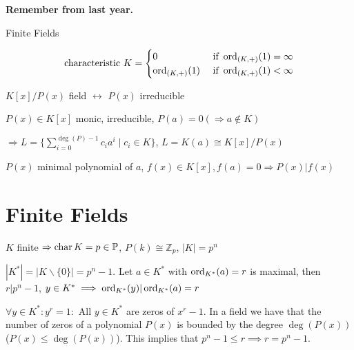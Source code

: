 

\textbf{Remember from last year.}

Finite Fields

\[
  \text{characteristic } K =
  \begin{cases}
    0                & \text{ if } \operatorname{ord}_{(K,+)} (1) = \infty \\
    \operatorname{ord}_{(K,+)} (1) & \text{ if } \operatorname{ord}_{(K,+)} (1) < \infty \\
  \end{cases}
\]

$K[x] / P(x)$ field $\leftrightarrow$ $P(x)$ irreducible

$P(x) \in K[x]$ monic, irreducible, $P(a) = 0 ( \Rightarrow a \not\in K)$

$\Rightarrow L = \{ \sum_{i=0}^{\deg(P)-1} c_i a^i \mid c_i \in K \}$,
$L = K(a) \cong K[x] / P(x)$

$P(x)$ minimal polynomial of $a$, $f(x) \in K[x], f(a) = 0 \Rightarrow P(x)|f(x)$

\section{Finite Fields}

$K$ finite $\Rightarrow \operatorname{char} K = p \in \mathbb{P}$, $P(k) \cong \mathbb{Z}_p$, $|K| = p^n$

$|K^{*}| = | K \backslash \{0\}| = p^n -1$. Let $a \in K^{*}$ with $\operatorname{ord}_{K^{*}}(a)=r$ is maximal, then $ r| p^n-1$,
$y \in K^{*} \implies \operatorname{ord}_{K^{*}}(y) | \operatorname{ord}_{K^{*}}(a) = r$

$\forall y \in K^{*}: y^r = 1:$ All $y \in K^{*}$ are zeros of $x^r -1$.
In a field we have that the number of zeros of a polynomial $P(x)$ is bounded by the degree $\deg(P(x))$ ($P(x) \leq \deg(P(x))$). This implies that $p^n-1 \leq r \implies r = p^n-1$.

